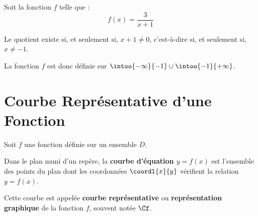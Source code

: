 \begin{exemple}
	Soit la fonction $f$ telle que : $$f(x) = \frac{3}{x+1}$$

	Le quotient existe si, et seulement si, $x+1 \neq 0$, c'est-à-dire si, et seulement si, $x \neq -1$.

	La fonction $f$ est donc définie sur $\intoo{-\infty}{-1} \cup \intoo{-1}{+\infty}$.
\end{exemple}

\section{Courbe Représentative d'une Fonction}

\begin{definition}
	Soit $f$ une fonction définie sur un ensemble $D$.

	Dans le plan muni d'un repère, la \textbf{courbe d'équation $y = f(x)$} est l'ensemble des points du plan dont les coordonnées $\coordl{x}{y}$ vérifient la relation $y = f(x)$.

	Cette courbe est appelée \textbf{courbe représentative} ou \textbf{représentation graphique} de la fonction $f$, souvent notée $\Cf$.
\end{definition}

